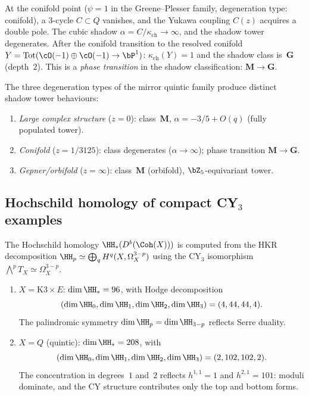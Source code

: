 \begin{remark}
\label{rem:conifold-shadow-transition}
At the conifold point ($\psi = 1$ in the Greene--Plesser family, degeneration type: conifold), a $3$-cycle $C \subset Q$ vanishes, and the Yukawa coupling $C(z)$ acquires a double pole. The cubic shadow $\alpha = C/\kappa_{\mathrm{ch}} \to \infty$, and the shadow tower degenerates. After the conifold transition to the resolved conifold $Y = \mathrm{Tot}(\cO(-1) \oplus \cO(-1) \to \bP^1)$: $\kappa_{\mathrm{ch}}(Y) = 1$ and the shadow class is~$\mathbf{G}$ (depth~$2$). This is a \emph{phase transition} in the shadow classification: $\mathbf{M} \to \mathbf{G}$.

The three degeneration types of the mirror quintic family produce distinct shadow tower behaviours:
\begin{enumerate}[label=\textup{(\alph*)}]
 \item \emph{Large complex structure} ($z = 0$): class~$\mathbf{M}$, $\alpha = -3/5 + O(q)$ (fully populated tower).
 \item \emph{Conifold} ($z = 1/3125$): class degenerates ($\alpha \to \infty$); phase transition $\mathbf{M} \to \mathbf{G}$.
 \item \emph{Gepner/orbifold} ($z = \infty$): class~$\mathbf{M}$ (orbifold), $\bZ_5$-equivariant tower.
\end{enumerate}
\end{remark}


\subsection{Hochschild homology of compact CY\texorpdfstring{$_3$}{-3} examples}
\label{subsec:cy3-hochschild}

The Hochschild homology $\HH_*(D^b(\Coh(X)))$ is computed from the HKR decomposition $\HH_p \simeq \bigoplus_q H^q(X, \Omega^{3-p}_X)$ using the CY$_3$ isomorphism $\bigwedge^p T_X \simeq \Omega^{3-p}_X$.

\begin{proposition}
\label{prop:cy3-hochschild-data}
\begin{enumerate}[label=(\roman*)]
 \item $X = \mathrm{K3} \times E$: $\dim \HH_* = 96$, with Hodge decomposition
 \[
 (\dim \HH_0, \dim \HH_1, \dim \HH_2, \dim \HH_3) = (4, 44, 44, 4).
 \]
 The palindromic symmetry $\dim \HH_p = \dim \HH_{3-p}$ reflects Serre duality.
 \item $X = Q$ \textup{(}quintic\textup{)}: $\dim \HH_* = 208$, with
 \[
 (\dim \HH_0, \dim \HH_1, \dim \HH_2, \dim \HH_3) = (2, 102, 102, 2).
 \]
 The concentration in degrees~$1$ and~$2$ reflects $h^{1,1} = 1$ and $h^{2,1} = 101$: moduli dominate, and the CY structure contributes only the top and bottom forms.
\end{enumerate}
\end{proposition}


